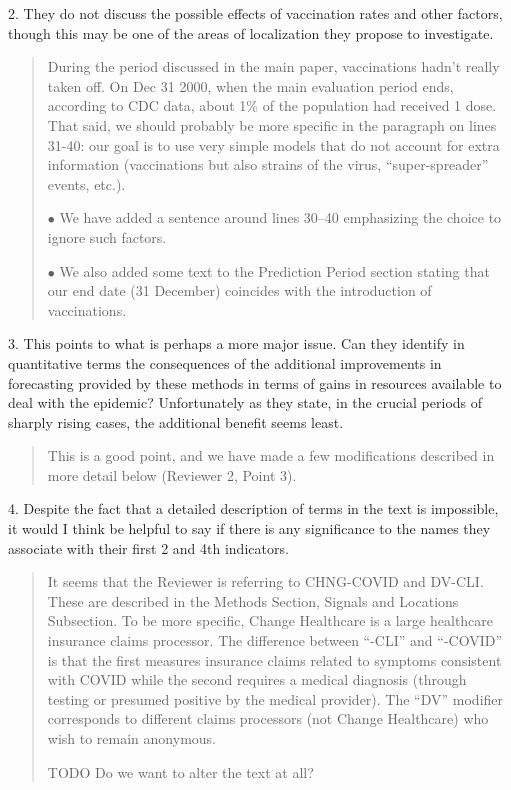 \documentclass[11pt]{article}
\newenvironment{resp}{\begin{quote}\color{cobalt}}{\end{quote}}
\begin{document}
  2. They do not discuss the possible effects of vaccination rates and other
  factors, though this may be one of the areas of localization they propose to
  investigate.



\begin{resp}
  During the period discussed in the main paper, vaccinations hadn’t really
  taken off. On Dec 31 2000, when the main evaluation period ends,  according to
  CDC data, about 1\% of the population 
  had received 1 dose. That said, we should probably be more specific in the
  paragraph on lines 31-40: our goal is to use very simple models that do not
  account for extra information (vaccinations but also strains of the virus,
  ``super-spreader'' events, etc.).

  $\bullet$ We have added a sentence around lines 30--40 emphasizing the choice
  to ignore such factors.

  $\bullet$ We also added some text to the Prediction Period section stating
  that our end 
  date (31 December) coincides with the introduction of vaccinations.
\end{resp}


  3. This points to what is perhaps a more major issue. Can they identify in
  quantitative terms the consequences of the additional improvements in
  forecasting provided by these methods in terms of gains in resources available
  to deal with the epidemic? Unfortunately as they state, in the crucial periods
  of sharply rising cases, the additional benefit seems least.


\begin{resp}
  This is a good point, and we have made a few modifications described in more
  detail below (Reviewer 2, Point 3).
\end{resp}



  4. Despite the fact that a detailed description of terms in the text is
  impossible, it would I think be helpful to say if there is any significance to
  the names they associate with their first 2 and 4th indicators.


\begin{resp}
  It seems that the Reviewer is referring to CHNG-COVID and DV-CLI. These are
  described in the Methods Section, Signals and Locations Subsection. To be more
  specific, Change 
  Healthcare is a large healthcare insurance claims processor. The difference
  between ``-CLI'' and ``-COVID'' is that the first measures insurance
  claims related to symptoms
  consistent with COVID while the second requires a medical diagnosis (through
  testing or presumed positive by the medical provider). The ``DV'' modifier
  corresponds to different claims processors (not Change Healthcare) who wish to
  remain anonymous.

  TODO Do we want to alter the text at all?
\end{resp}
\end{document}
